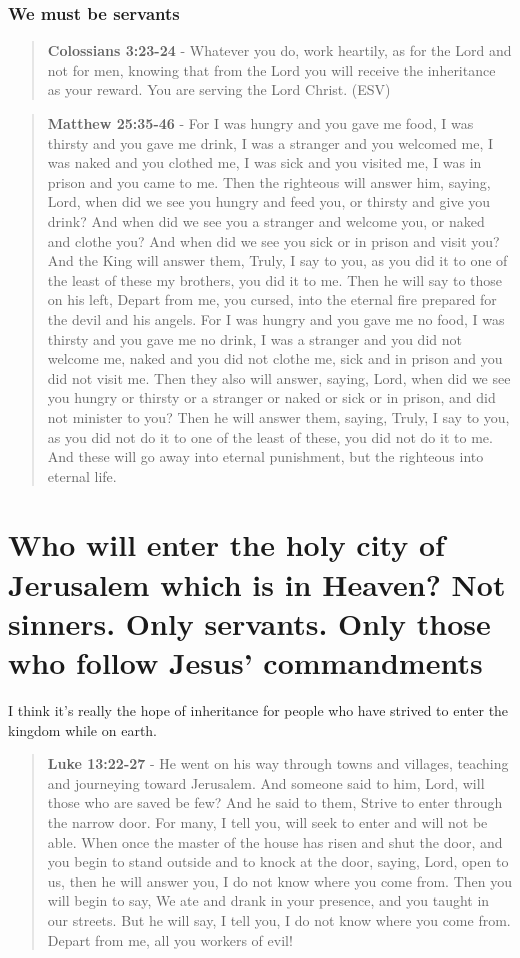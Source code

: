 \documentclass[11pt]{article}
\begin{document}
\subsubsection{We must be servants}
\label{sec:org64a0ce9}
\begin{quote}
\textbf{Colossians 3:23-24} -  Whatever you do, work heartily, as for the Lord and not for men, knowing that from the Lord you will receive the inheritance as your reward. You are serving the Lord Christ.  (ESV)
\end{quote}

\begin{quote}
\textbf{Matthew 25:35-46} - For I was hungry and you gave me food, I was thirsty and you gave me drink, I was a stranger and you welcomed me, I was naked and you clothed me, I was sick and you visited me, I was in prison and you came to me. Then the righteous will answer him, saying, Lord, when did we see you hungry and feed you, or thirsty and give you drink? And when did we see you a stranger and welcome you, or naked and clothe you? And when did we see you sick or in prison and visit you? And the King will answer them, Truly, I say to you, as you did it to one of the least of these my brothers, you did it to me. Then he will say to those on his left, Depart from me, you cursed, into the eternal fire prepared for the devil and his angels. For I was hungry and you gave me no food, I was thirsty and you gave me no drink, I was a stranger and you did not welcome me, naked and you did not clothe me, sick and in prison and you did not visit me. Then they also will answer, saying, Lord, when did we see you hungry or thirsty or a stranger or naked or sick or in prison, and did not minister to you? Then he will answer them, saying, Truly, I say to you, as you did not do it to one of the least of these, you did not do it to me. And these will go away into eternal punishment, but the righteous into eternal life.
\end{quote}

\section{Who will enter the holy city of Jerusalem which is in Heaven? Not sinners. Only servants. Only those who follow Jesus' commandments}
\label{sec:orga47dff1}
I think it's really the hope of inheritance for people who have strived to enter the kingdom while on earth.

\begin{quote}
\textbf{Luke 13:22-27} - He went on his way through towns and villages, teaching and journeying toward Jerusalem. And someone said to him, Lord, will those who are saved be few? And he said to them, Strive to enter through the narrow door. For many, I tell you, will seek to enter and will not be able. When once the master of the house has risen and shut the door, and you begin to stand outside and to knock at the door, saying, Lord, open to us, then he will answer you, I do not know where you come from. Then you will begin to say, We ate and drank in your presence, and you taught in our streets. But he will say, I tell you, I do not know where you come from. Depart from me, all you workers of evil!
\end{quote}
\end{document}
